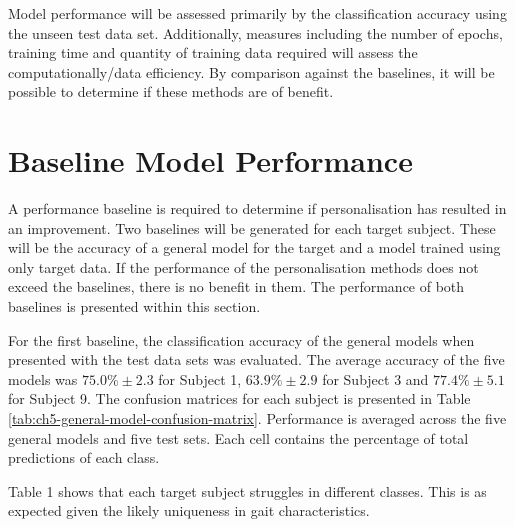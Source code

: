 Model performance will be assessed primarily by the classification accuracy using the unseen test data set. Additionally, measures including the number of epochs, training time and quantity of training data required will assess the computationally/data efficiency. By comparison against the baselines, it will be possible to determine if these methods are of benefit.

\section{Baseline Model Performance}
\label{sec:personalisation-baseline-model-results}
A performance baseline is required to determine if personalisation has resulted in an improvement. Two baselines will be generated for each target subject. These will be the accuracy of a general model for the target and a model trained using only target data. If the performance of the personalisation methods does not exceed the baselines, there is no benefit in them. The performance of both baselines is presented within this section.

For the first baseline, the classification accuracy of the general models when presented with the test data sets was evaluated. The average accuracy of the five models was $75.0\%\pm2.3$ for Subject 1, $63.9\%\pm2.9$ for Subject 3 and $77.4\%\pm5.1$ for Subject 9. The confusion matrices for each subject is presented in Table \ref{tab:ch5-general-model-confusion-matrix}. Performance is averaged across the five general models and five test sets. Each cell contains the percentage of total predictions of each class.

Table 1 shows that each target subject struggles in different classes. This is as expected given the likely uniqueness in gait characteristics.

